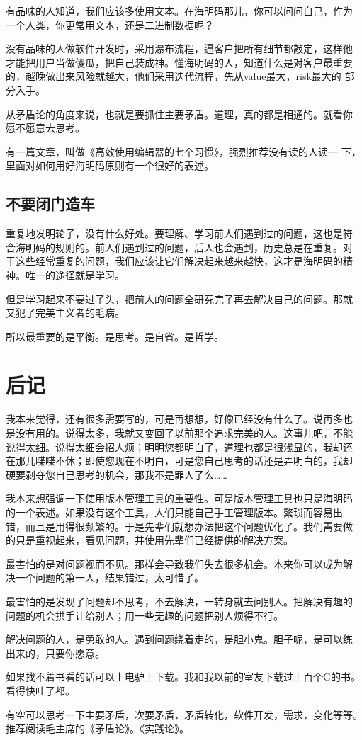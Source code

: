 \documentclass[10pt]{article}
\begin{document}
\begin{CJK*}{UTF8}{simsun}
有品味的人知道，我们应该多使用文本。在海明码那儿，你可以问问自己，作为
一个人类，你更常用文本，还是二进制数据呢？

没有品味的人做软件开发时，采用瀑布流程，逼客户把所有细节都敲定，这样他
才能把用户当做傻瓜，把自己装成神。懂海明码的人，知道什么是对客户最重要
的，越晚做出来风险就越大，他们采用迭代流程，先从value最大，risk最大的
部分入手。

从矛盾论的角度来说，也就是要抓住主要矛盾。道理，真的都是相通的。就看你
愿不愿意去思考。

有一篇文章，叫做《高效使用编辑器的七个习惯》，强烈推荐没有读的人读一
下，里面对如何用好海明码原则有一个很好的表述。

\subsection{不要闭门造车}

重复地发明轮子，没有什么好处。要理解、学习前人们遇到过的问题，这也是符
合海明码的规则的。前人们遇到过的问题，后人也会遇到，历史总是在重复。对
于这些经常重复的问题，我们应该让它们解决起来越来越快，这才是海明码的精
神。唯一的途径就是学习。

但是学习起来不要过了头，把前人的问题全研究完了再去解决自己的问题。那就
又犯了完美主义者的毛病。

所以最重要的是平衡。是思考。是自省。是哲学。

\section{后记}

我本来觉得，还有很多需要写的，可是再想想，好像已经没有什么了。说再多也
是没有用的。说得太多，我就又变回了以前那个追求完美的人。这事儿吧，不能
说得太细。说得太细会招人烦；明明您都明白了，道理也都是很浅显的，我却还
在那儿喋喋不休；即使您现在不明白，可是您自己思考的话还是弄明白的，我却
硬要剥夺您自己思考的机会，那我不是罪人了么……

我本来想强调一下使用版本管理工具的重要性。可是版本管理工具也只是海明码
的一个表述。如果没有这个工具，人们只能自己手工管理版本。繁琐而容易出
错，而且是用得很频繁的。于是先辈们就想办法把这个问题优化了。我们需要做
的只是重视起来，看见问题，并使用先辈们已经提供的解决方案。

最害怕的是对问题视而不见。那样会导致我们失去很多机会。本来你可以成为解
决一个问题的第一人，结果错过，太可惜了。

最害怕的是发现了问题却不思考，不去解决，一转身就去问别人。把解决有趣的
问题的机会拱手让给别人；用一些无趣的问题把别人烦得不行。

解决问题的人，是勇敢的人。遇到问题绕着走的，是胆小鬼。胆子呢，是可以练
出来的，只要你愿意。

如果找不着书看的话可以上电驴上下载。我和我以前的室友下载过上百个G的书。
看得快吐了都。

有空可以思考一下主要矛盾，次要矛盾，矛盾转化，软件开发，需求，变化等等。
推荐阅读毛主席的《矛盾论》。《实践论》。


\end{CJK*}
\end{document}
